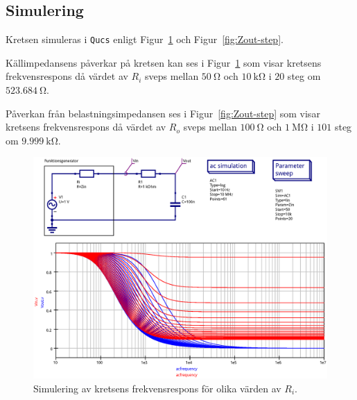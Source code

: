 



\subsection{Simulering}\label{}
Kretsen simuleras i \texttt{Qucs} enligt Figur~\ref{fig:Zin-step} och
Figur~\ref{fig:Zout-step}.

Källimpedansens påverkar på kretsen kan ses i Figur~\ref{fig:Zin-step} som
visar kretsens frekvensrespons då värdet av $R_i$ sveps mellan $\SI{50}{\ohm}$
och $\SI{10}{\kohm}$ i $20$ steg om $\SI{523.684}{\ohm}$.

Påverkan från belastningsimpedansen ses i Figur~\ref{fig:Zout-step} som visar
kretsens frekvensrespons då värdet av $R_o$ sveps mellan $\SI{100}{\ohm}$ och
$\SI{1}{\mega\ohm}$ i $101$ steg om $\SI{9.999}{\kohm}$.


\begin{figure}[ht]\label{fig:Zin-step}
  \centering
  \includegraphics[width=\linewidth]{sim/ee466_lab-4_prj/uppgift-3_Zin_step}
  \caption[] {Simulering av kretsens frekvensrespons för olika värden av $R_i$.}
\end{figure}

